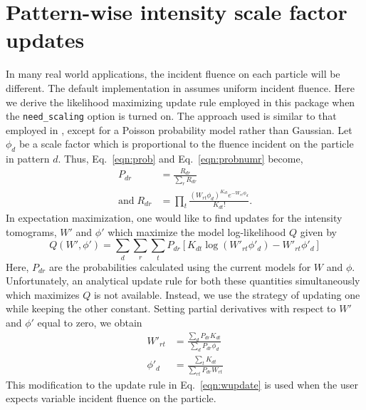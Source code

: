 \documentclass[]{iucr}              %
\begin{document}
\section{Pattern-wise intensity scale factor updates}\label{sec:rescaling}
In many real world applications, the incident fluence on each particle will be different. The default implementation in  assumes uniform incident fluence. Here we derive the likelihood maximizing update rule employed in this package when the \texttt{need\_scaling} option is turned on. The approach used is similar to that employed in , except for a Poisson probability model rather than Gaussian. Let $\phi_d$ be a scale factor which is proportional to the fluence incident on the particle in pattern $d$. Thus, Eq.~\ref{eqn:prob} and Eq.~\ref{eqn:probnumr} become,
\begin{align}
P_{dr} &= \frac{R_{dr}}{\sum\limits_r R_{dr}} \\
\mathrm{and }\;R_{dr} &= \prod_t \frac{(W_{rt}\phi_d)^{K_{dt}} e^{-W_{rt}\phi_d}}{K_{dt}!}.
\end{align}
In expectation maximization, one would like to find updates for the intensity tomograms, $W'$ and $\phi'$ which maximize the model log-likelihood $Q$ given by
\[Q(W', \phi') = \sum_d \sum_r \sum_t P_{dr} \left[K_{dt}\log(W'_{rt} \phi'_d) - W'_{rt} \phi'_d\right]\]
Here, $P_{dr}$ are the probabilities calculated using the current models for $W$ and $\phi$. Unfortunately, an analytical update rule for both these quantities simultaneously which maximizes $Q$ is not available. Instead, we use the strategy of updating one while keeping the other constant. Setting partial derivatives with respect to $W'$ and $\phi'$ equal to zero, we obtain
\begin{align}
W'_{rt} &= \frac{\sum\limits_d P_{dr} K_{dt}}{\sum\limits_d P_{dr} \phi_d} \\
\phi'_d &= \frac{\sum\limits_t K_{dt}}{\sum\limits_{rt} P_{dr} W_{rt}}
\end{align}
This modification to the update rule in Eq.~\ref{eqn:wupdate} is used when the user expects variable incident fluence on the particle.


\end{document}

